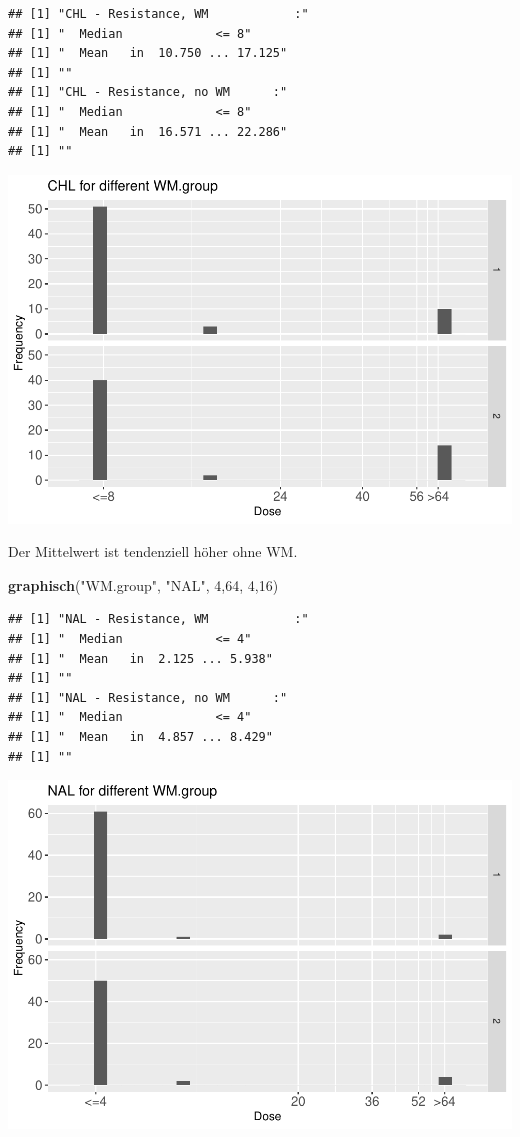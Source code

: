 \documentclass[
]{article}
\newenvironment{Shaded}{\begin{snugshade}}{\end{snugshade}}
\newcommand{\DecValTok}[1]{\textcolor[rgb]{0.00,0.00,0.81}{#1}}
\newcommand{\KeywordTok}[1]{\textcolor[rgb]{0.13,0.29,0.53}{\textbf{#1}}}
\newcommand{\NormalTok}[1]{#1}
\newcommand{\StringTok}[1]{\textcolor[rgb]{0.31,0.60,0.02}{#1}}
\begin{document}
\begin{verbatim}
## [1] "CHL - Resistance, WM            :"
## [1] "  Median             <= 8"
## [1] "  Mean   in  10.750 ... 17.125"
## [1] ""
## [1] "CHL - Resistance, no WM      :"
## [1] "  Median             <= 8"
## [1] "  Mean   in  16.571 ... 22.286"
## [1] ""
\end{verbatim}

\includegraphics{Verteilungen_files/figure-latex/unnamed-chunk-39-1.pdf}

Der Mittelwert ist tendenziell höher ohne WM.

\begin{Shaded}
\begin{Highlighting}[]
  \KeywordTok{graphisch}\NormalTok{(}\StringTok{"WM.group"}\NormalTok{, }\StringTok{"NAL"}\NormalTok{, }\DecValTok{4}\NormalTok{,}\DecValTok{64}\NormalTok{, }\DecValTok{4}\NormalTok{,}\DecValTok{16}\NormalTok{) }
\end{Highlighting}
\end{Shaded}

\begin{verbatim}
## [1] "NAL - Resistance, WM            :"
## [1] "  Median             <= 4"
## [1] "  Mean   in  2.125 ... 5.938"
## [1] ""
## [1] "NAL - Resistance, no WM      :"
## [1] "  Median             <= 4"
## [1] "  Mean   in  4.857 ... 8.429"
## [1] ""
\end{verbatim}

\includegraphics{Verteilungen_files/figure-latex/unnamed-chunk-40-1.pdf}
\end{document}
